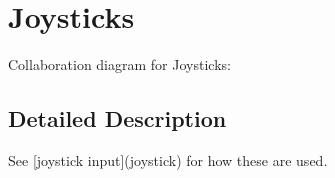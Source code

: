 \hypertarget{group__joysticks}{
\section{Joysticks}
\label{group__joysticks}
}


Collaboration diagram for Joysticks:

\subsection{Detailed Description}
See \mbox{[}joystick input\mbox{]}(joystick) for how these are used. 